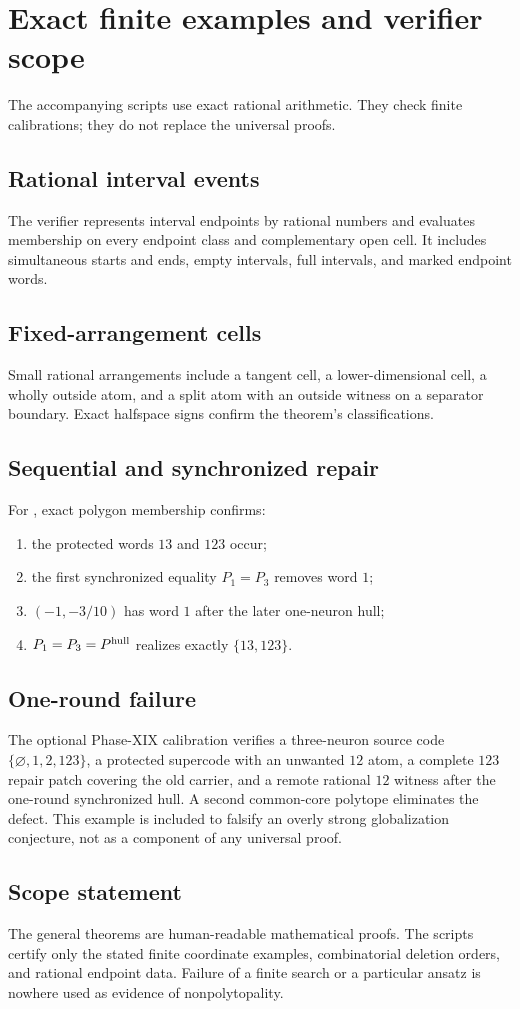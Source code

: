 \section{Exact finite examples and verifier scope}
\label{app:exact-examples}

The accompanying scripts use exact rational arithmetic.  They check finite calibrations; they do not replace the universal proofs.

\subsection{Rational interval events}
The verifier represents interval endpoints by rational numbers and evaluates membership on every endpoint class and complementary open cell.  It includes simultaneous starts and ends, empty intervals, full intervals, and marked endpoint words.

\subsection{Fixed-arrangement cells}
Small rational arrangements include a tangent cell, a lower-dimensional cell, a wholly outside atom, and a split atom with an outside witness on a separator boundary.  Exact halfspace signs confirm the theorem's classifications.

\subsection{Sequential and synchronized repair}
For , exact polygon membership confirms:
\begin{enumerate}
\item the protected words $13$ and $123$ occur;
\item the first synchronized equality $P_1=P_3$ removes word $1$;
\item $(-1,-3/10)$ has word $1$ after the later one-neuron hull;
\item $P_1=P_3=P^{\rm hull}$ realizes exactly $\{13,123\}$.
\end{enumerate}

\subsection{One-round failure}
The optional Phase-XIX calibration verifies a three-neuron source code $\{\varnothing,1,2,123\}$, a protected supercode with an unwanted $12$ atom, a complete $123$ repair patch covering the old carrier, and a remote rational $12$ witness after the one-round synchronized hull.  A second common-core polytope eliminates the defect.  This example is included to falsify an overly strong globalization conjecture, not as a component of any universal proof.

\subsection{Scope statement}
The general theorems are human-readable mathematical proofs.  The scripts certify only the stated finite coordinate examples, combinatorial deletion orders, and rational endpoint data.  Failure of a finite search or a particular ansatz is nowhere used as evidence of nonpolytopality.

